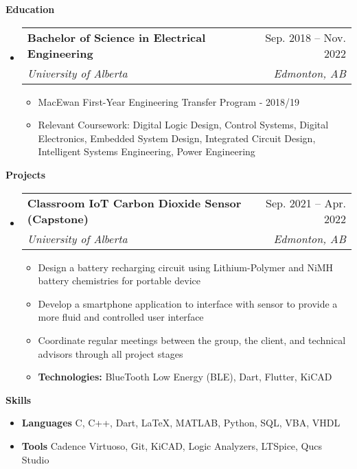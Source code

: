 \documentclass[letterpaper,12pt]{article}[leftmargin=*]
\makeatletter
\def \entryspacing {-0pt}
\renewcommand{\section}[2]{\vspace{5pt}
  \colorbox{secondary}{\color{white}\raggedbottom\normalsize\textbf{{#1}{\hspace{7pt}#2}}}
}
\newcommand{\resumeEntryStart}{\begin{itemize}[leftmargin=2.5mm]}
\newcommand{\resumeEntryEnd}{\end{itemize}\vspace{\entryspacing}}
\newcommand{\resumeItemListStart}{\begin{itemize}[leftmargin=4.5mm]}
\newcommand{\resumeItemListEnd}{\end{itemize}}
\newcommand{\resumeItem}[1]{
  \item\small{
    {#1 \vspace{-2pt}}
  }
}
\newcommand{\resumeEntryTSDL}[4]{
  \vspace{-1pt}\item[]
    \begin{tabularx}{0.97\textwidth}{X@{\hspace{60pt}}r}
      \textbf{\color{primary}#1} & {\firabook\color{accent}\small#2} \\
      \textit{\color{accent}\small#3} & \textit{\color{accent}\small#4} \\
    \end{tabularx}\vspace{-6pt}
}
\newcommand{\resumeEntryS}[2]{
  \item[]\small{
    \textbf{\color{primary}#1 }{ #2 \vspace{-6pt}}
  }
}
\makeatother
\begin{document}
\section{\faGraduationCap}{Education}

  \resumeEntryStart
    \resumeEntryTSDL
      {Bachelor of Science in Electrical Engineering}{Sep. 2018 -- Nov. 2022}
      {University of Alberta}{Edmonton, AB}
  \resumeItemListStart
    \resumeItem{MacEwan First-Year Engineering Transfer Program - 2018/19}
    \resumeItem{Relevant Coursework: Digital Logic Design, Control Systems, Digital Electronics, Embedded System Design, Integrated Circuit Design, Intelligent Systems Engineering, Power Engineering}
  \resumeItemListEnd
  \resumeEntryEnd

\section{\faFlask}{Projects}

  \resumeEntryStart
    \resumeEntryTSDL
      {Classroom IoT Carbon Dioxide Sensor (Capstone)}{Sep. 2021 -- Apr. 2022}
      {University of Alberta}{Edmonton, AB}
    \resumeItemListStart
      \resumeItem {Design a battery recharging circuit using Lithium-Polymer and NiMH battery chemistries for portable device}
      \resumeItem {Develop a smartphone application to interface with sensor to provide a more fluid and controlled user interface}
      \resumeItem {Coordinate regular meetings between the group, the client, and technical advisors through all project stages}
      \resumeItem {\textbf{Technologies:} BlueTooth Low Energy (BLE), Dart, Flutter, KiCAD}
    \resumeItemListEnd
  \resumeEntryEnd

\section{\faGears}{Skills}

 \resumeEntryStart
  \resumeEntryS{Languages } {C, C++, Dart, LaTeX, MATLAB, Python, SQL, VBA, VHDL}
  \resumeEntryS{Tools } {Cadence Virtuoso, Git, KiCAD, Logic Analyzers, LTSpice, Qucs Studio}
 \resumeEntryEnd

\end{document}
